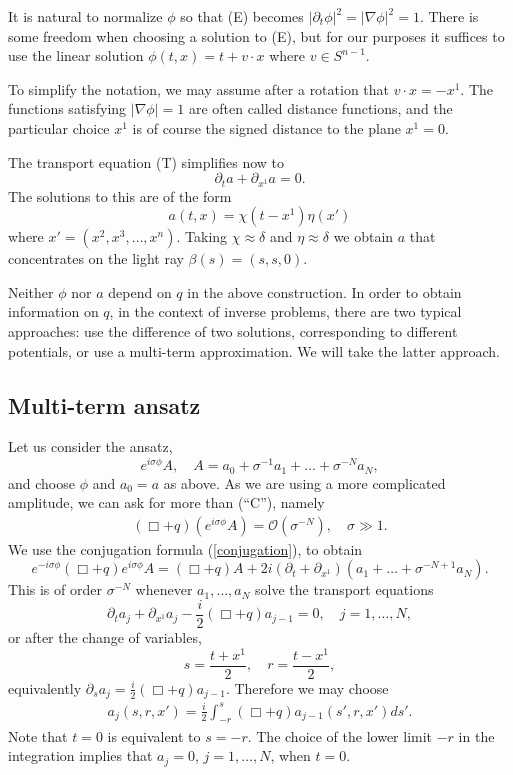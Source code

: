 \documentclass[12pt,oneside,final]{amsart}
\def\p{\partial}
\begin{document}
It is natural to normalize $\phi$ so that (E) becomes 
$|\p_t \phi|^2 = |\nabla \phi|^2 = 1$.
There is some freedom when choosing a solution to (E), but for our purposes it suffices to use the linear solution $\phi(t,x) = t + v \cdot x$ where $v \in S^{n-1}$.


To simplify the notation, we may assume after a rotation that $v \cdot x = -x^1$. The functions satisfying $|\nabla \phi| = 1$ are often called distance functions, and the particular choice $x^1$ is of course the signed distance to the plane $x^1 = 0$. 

The transport equation (T) simplifies now to 
$$
\p_t a + \p_{x^1} a = 0.
$$
The solutions to this are of the form $$a(t,x) = \chi(t - x^1) \eta(x')$$ where $x' = (x^2, x^3, \dots, x^n)$.
Taking $\chi \approx \delta$ and $\eta \approx \delta$ we obtain $a$ that concentrates on the light ray $\beta(s) = (s,s,0)$.

Neither $\phi$ nor $a$ depend on $q$ in the above construction. In order to obtain information on $q$, in the context of inverse problems, there are two typical approaches: use the difference of two solutions, corresponding to different potentials, or use a multi-term approximation. We will take the latter approach.


\subsection{Multi-term ansatz}

Let us consider the ansatz,
$$e^{i \sigma \phi} A, \quad A = a_0 + \sigma^{-1} a_1 + \dots + \sigma^{-N} a_N,$$
and choose $\phi$ and $a_0 = a$ as above.
As we are using a more complicated amplitude, we can ask for more than (``C''), namely 
\begin{align*}%
(\Box + q) (e^{i\sigma \phi} A) = \mathcal O(\sigma^{-N}), 
\quad \sigma \gg 1. 
\end{align*}
We use the conjugation formula (\ref{conjugation}), to obtain
$$
e^{-i\sigma \phi} (\Box + q) e^{i\sigma \phi} A
= (\Box + q) A + 2i (\p_t + \p_{x^1}) (a_1 + \dots + \sigma^{-N+1} a_N).
$$
This is of order $\sigma^{-N}$ whenever $a_1,\dots,a_N$ solve the transport equations
$$
\p_t a_j + \p_{x^1} a_j - \frac i 2 (\Box + q) a_{j-1} = 0, \quad j=1,\dots,N,
$$
or after the change of variables,
$$
s = \frac{t+x^1} 2, \quad r = \frac{t-x^1} 2,
$$
equivalently $\p_s a_j = \frac i 2 (\Box + q) a_{j-1}$.
Therefore we may choose
	\begin{align}\label{def_aj}
a_j(s,r,x') = \frac i 2 \int_{-r}^s (\Box + q) a_{j-1}(s',r,x') ds'.
	\end{align}
Note that $t=0$ is equivalent to $s = -r$. The choice of the lower limit $-r$ in the integration implies that $a_j = 0$, $j=1,\dots,N$, when $t=0$.
\end{document}
